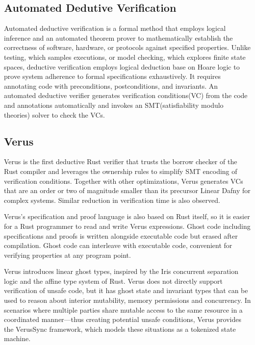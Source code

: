\documentclass[conference]{IEEEtran}
\begin{document}
\subsection{Automated Dedutive Verification}
Automated deductive verification is a formal method that employs logical inference and an automated theorem prover to mathematically establish the correctness of software, hardware, or protocols against specified properties. Unlike testing, which samples executions, or model checking, which explores finite state spaces, deductive verification employs logical deduction base on Hoare logic to prove system adherence to formal specifications exhaustively. It requires annotating code with preconditions, postconditions, and invariants. An automated deductive verifier generates verification conditions(VC) from the code and annotations automatically and invokes an SMT(satisfiability modulo theories) solver to check the VCs.

\subsection{Verus}
Verus\cite{verus} is the first deductive Rust verifier that trusts the borrow checker of the Rust compiler and leverages the ownership rules to simplify SMT encoding of verification conditions. Together with other optimizations, Verus generates VCs that are an order or two of magnitude smaller\cite{VerifyingConcurrentSystemsCode} than its precursor Linear Dafny\cite{linearDafny} for complex systems. Similar reduction in verification time is also observed. 

Verus's specification and proof language is also based on Rust itself, so it is easier for a Rust programmer to read and write Verus expressions. Ghost code including specifications and proofs is written alongside executable code but erased after compilation. Ghost code can interleave with executable code, convenient for verifying properties at any program point.   

Verus introduces linear ghost types, inspired by the Iris concurrent separation logic\cite{Iris_contributors_Iris} and the affine type system of Rust. Verus does not directly support verification of unsafe code, but it has ghost state and invariant types that can be used to reason about interior mutability, memory permissions and concurrency. In scenarios where multiple parties share mutable access to the same resource in a coordinated manner—thus creating potential unsafe conditions, Verus provides the VerusSync framework, which models these situations as a tokenized state machine.    
\end{document}
